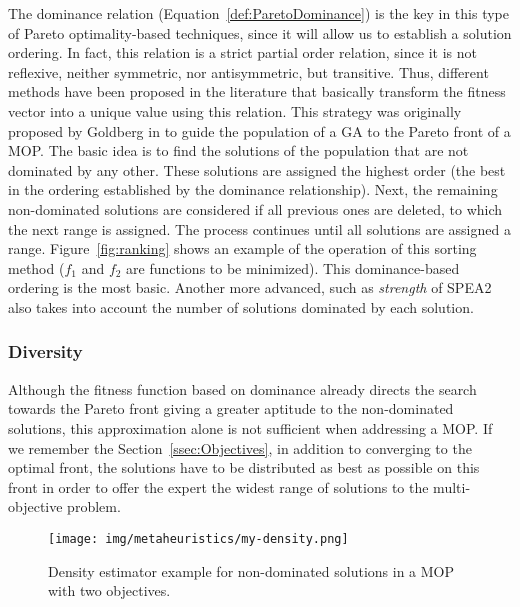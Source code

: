 The dominance relation (Equation~\ref{def:ParetoDominance}) is the key in this type of Pareto optimality-based techniques, since it will allow us to establish a solution ordering. In fact, this relation is a strict partial order relation, since it is not reflexive, neither symmetric, nor antisymmetric, but transitive. Thus, different methods have been proposed in the literature \cite{coello07evolutionary, deb01multiobjective} that basically transform the fitness vector into a unique value using this relation. This strategy was originally proposed by Goldberg in \cite{goldberg89genetic} to guide the population of a GA to the Pareto front of a MOP. The basic idea is to find the solutions of the population that are not dominated by any other. These solutions are assigned the highest order (the best in the ordering established by the dominance relationship). Next, the remaining non-dominated solutions are considered if all previous ones are deleted, to which the next range is assigned. The process continues until all solutions are assigned a range. Figure~\ref{fig:ranking} shows an example of the operation of this sorting method ($f_1$ and $f_2$ are functions to be minimized). This dominance-based ordering is the most basic. Another more advanced, such as \emph{strength} of SPEA2 \cite{zitzler01spea2} also takes into account the number of solutions dominated by each solution.

\subsubsection{Diversity}
\label{sssec:Diversity}

Although the fitness function based on dominance already directs the search towards the Pareto front giving a greater aptitude to the non-dominated solutions, this approximation alone is not sufficient when addressing a MOP. If we remember the Section~\ref{ssec:Objectives}, in addition to converging to the optimal front, the solutions have to be distributed as best as possible on this front in order to offer the expert the widest range of solutions to the multi-objective problem.

\begin{figure}[H] %
	\centering 
	\texttt{[image: img/metaheuristics/my-density.png]}
	\caption{Density estimator example for non-dominated solutions in a MOP with two objectives.}
	\label{fig:crowding}
\end{figure}

